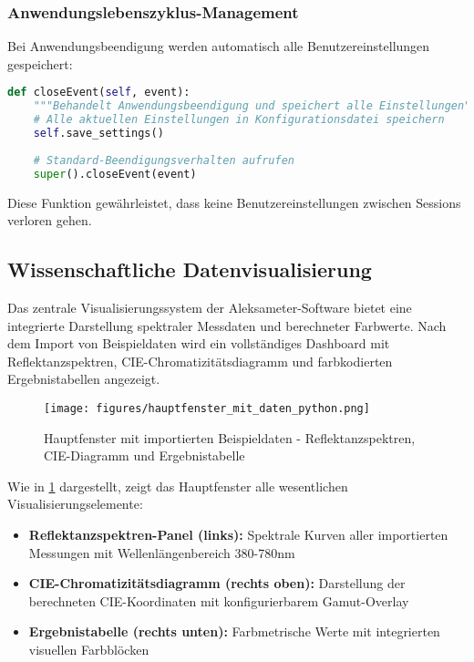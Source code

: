 \subsubsection{Anwendungslebenszyklus-Management}

Bei Anwendungsbeendigung werden automatisch alle Benutzereinstellungen gespeichert:

\begin{lstlisting}[language=Python, caption=Automatische Einstellungsspeicherung bei Beendigung]
def closeEvent(self, event):
    """Behandelt Anwendungsbeendigung und speichert alle Einstellungen"""
    # Alle aktuellen Einstellungen in Konfigurationsdatei speichern
    self.save_settings()
    
    # Standard-Beendigungsverhalten aufrufen
    super().closeEvent(event)
\end{lstlisting}

Diese Funktion gewährleistet, dass keine Benutzereinstellungen zwischen Sessions verloren gehen.

\subsection{Wissenschaftliche Datenvisualisierung}

Das zentrale Visualisierungssystem der Aleksameter-Software bietet eine integrierte Darstellung spektraler Messdaten und berechneter Farbwerte. Nach dem Import von Beispieldaten wird ein vollständiges Dashboard mit Reflektanzspektren, CIE-Chromatizitätsdiagramm und farbkodierten Ergebnistabellen angezeigt.

\begin{figure}[H]
    \centering
\texttt{[image: figures/hauptfenster\_mit\_daten\_python.png]}
\caption{Hauptfenster mit importierten Beispieldaten - Reflektanzspektren, CIE-Diagramm und Ergebnistabelle}
\label{fig:hauptfenster_mit_daten}
\end{figure}

Wie in \ref{fig:hauptfenster_mit_daten} dargestellt, zeigt das Hauptfenster alle wesentlichen Visualisierungselemente:

\begin{itemize}
    \item \textbf{Reflektanzspektren-Panel (links):} Spektrale Kurven aller importierten Messungen mit Wellenlängenbereich 380-780nm
    \item \textbf{CIE-Chromatizitätsdiagramm (rechts oben):} Darstellung der berechneten CIE-Koordinaten mit konfigurierbarem Gamut-Overlay
    \item \textbf{Ergebnistabelle (rechts unten):} Farbmetrische Werte mit integrierten visuellen Farbblöcken
\end{itemize}

